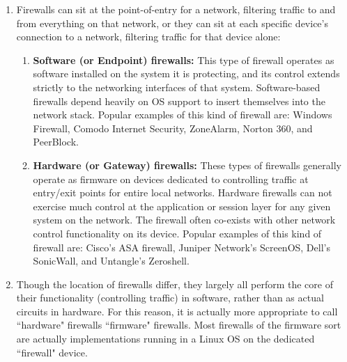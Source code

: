 \documentclass[12pt]{extarticle}
\newcommand{\ben}{\begin{enumerate}}
\newcommand{\een}{\end{enumerate}}
\begin{document}
\vspace{8mm}
\ben

\item { Firewalls can sit at the point-of-entry for a network, filtering traffic to and from everything on that network, or they can sit at each specific device's connection to a network, filtering traffic for that device alone: }

\ben

\item { \textbf{Software (or Endpoint) firewalls:} This type of firewall operates as software installed on the system it is protecting, and its control extends strictly to the networking interfaces of that system. Software-based firewalls depend heavily on OS support to insert themselves into the network stack. Popular examples of this kind of firewall are: Windows Firewall, Comodo Internet Security, ZoneAlarm, Norton 360, and PeerBlock. }

\item { \textbf{Hardware (or Gateway) firewalls:} These types of firewalls generally operate as firmware on devices dedicated to controlling traffic at entry/exit points for entire local networks. Hardware firewalls can not exercise much control at the application or session layer for any given system on the network. The firewall often co-exists with other network control functionality on its device. Popular examples of this kind of firewall are: Cisco's ASA firewall, Juniper Network's ScreenOS, Dell's SonicWall, and Untangle's Zeroshell. }

\een

\item { Though the location of firewalls differ, they largely all perform the core of their functionality (controlling traffic) in software, rather than as actual circuits in hardware. For this reason, it is actually more appropriate to call ``hardware" firewalls ``firmware" firewalls. Most firewalls of the firmware sort are actually implementations running in a Linux OS on the dedicated ``firewall" device. }

\een


\end{document}
